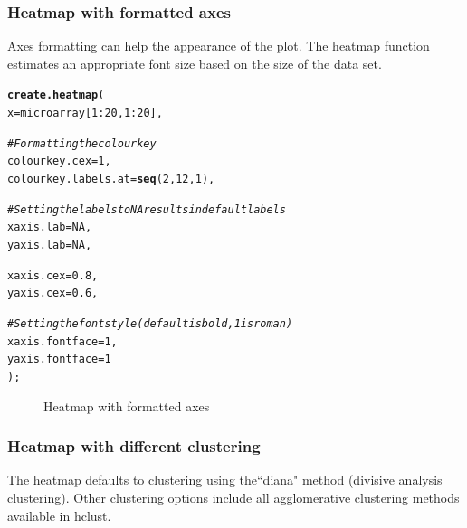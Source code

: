 \documentclass[letterpaper]{article}\usepackage[]{graphicx}\usepackage[]{color}
\makeatletter
\newcommand{\hlnum}[1]{\textcolor[rgb]{0.686,0.059,0.569}{#1}}%
\newcommand{\hlcom}[1]{\textcolor[rgb]{0.678,0.584,0.686}{\textit{#1}}}%
\newcommand{\hlopt}[1]{\textcolor[rgb]{0,0,0}{#1}}%
\newcommand{\hlstd}[1]{\textcolor[rgb]{0.345,0.345,0.345}{#1}}%
\newcommand{\hlkwc}[1]{\textcolor[rgb]{0.333,0.667,0.333}{#1}}%
\newcommand{\hlkwd}[1]{\textcolor[rgb]{0.737,0.353,0.396}{\textbf{#1}}}%
\newenvironment{kframe}{%
 \def\at@end@of@kframe{}%
 \ifinner\ifhmode%
  \def\at@end@of@kframe{\end{minipage}}%
  \begin{minipage}{\columnwidth}%
 \fi\fi%
 \def\FrameCommand##1{\hskip\@totalleftmargin \hskip-\fboxsep
 \colorbox{shadecolor}{##1}\hskip-\fboxsep
     \hskip-\linewidth \hskip-\@totalleftmargin \hskip\columnwidth}%
 \MakeFramed {\advance\hsize-\width
   \@totalleftmargin\z@ \linewidth\hsize
   \@setminipage}}%
 {\par\unskip\endMakeFramed%
 \at@end@of@kframe}
\newenvironment{knitrout}{}{} %
\makeatother
\begin{document}
\subsubsection{Heatmap with formatted axes}
Axes formatting can help the appearance of the plot. The heatmap function estimates an appropriate font size based on the size of the data set.
\begin{knitrout}
\color{fgcolor}\begin{kframe}
\begin{alltt}
\hlkwd{create.heatmap}\hlstd{(}
    \hlkwc{x} \hlstd{= microarray[}\hlnum{1}\hlopt{:}\hlnum{20}\hlstd{,} \hlnum{1}\hlopt{:}\hlnum{20}\hlstd{],}

    \hlcom{# Formatting the colour key}
    \hlkwc{colourkey.cex} \hlstd{=} \hlnum{1}\hlstd{,}
    \hlkwc{colourkey.labels.at} \hlstd{=} \hlkwd{seq}\hlstd{(}\hlnum{2}\hlstd{,} \hlnum{12}\hlstd{,} \hlnum{1}\hlstd{),}

    \hlcom{# Setting the labels to NA results in default labels}
    \hlkwc{xaxis.lab} \hlstd{=} \hlnum{NA}\hlstd{,}
    \hlkwc{yaxis.lab} \hlstd{=} \hlnum{NA}\hlstd{,}

    \hlkwc{xaxis.cex} \hlstd{=} \hlnum{0.8}\hlstd{,}
    \hlkwc{yaxis.cex} \hlstd{=} \hlnum{0.6}\hlstd{,}

    \hlcom{# Setting the font style (default is bold, 1 is roman)}
    \hlkwc{xaxis.fontface} \hlstd{=} \hlnum{1}\hlstd{,}
    \hlkwc{yaxis.fontface} \hlstd{=} \hlnum{1}
    \hlstd{);}
\end{alltt}
\end{kframe}\begin{figure}[]


{\centering {} 

}

\caption[Heatmap with formatted axes]{Heatmap with formatted axes\label{fig:heatmap2}}
\end{figure}


\end{knitrout}

\subsubsection{Heatmap with different clustering}
The heatmap defaults to clustering using the``diana" method (divisive analysis clustering). Other clustering options include all agglomerative clustering methods available in hclust.
\end{document}
